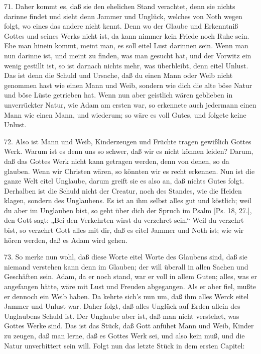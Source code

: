 71. Daher kommt es, daß sie den ehelichen Stand verachtet, denn sie nichts darinne findet und sieht denn Jammer und Unglück, welches von Noth wegen folgt, wo eines das andere nicht kennt. Denn wo der Glaube und Erkenntniß Gottes und seines Werks nicht ist, da kann nimmer kein Friede noch Ruhe sein. Ehe man hinein kommt, meint man, es soll eitel Lust darinnen sein. Wenn man nun darinne ist, und meint zu finden, was man gesucht hat, und der Vorwitz ein wenig gestillt ist, so ist darnach nichts mehr, was überbleibt, denn eitel Unlust. Das ist denn die Schuld und Ursache, daß du einen Mann oder Weib nicht genommen hast wie einen Mann und Weib, sondern wie dich die alte böse Natur und böse Lüste getrieben hat. Wenn nun aber geistlich wären geblieben in unverrückter Natur, wie Adam am ersten war, so erkennete auch jedermann einen Mann wie einen Mann, und wiederum; so wäre es voll Gutes, und folgete keine Unlust.

72. Also ist Mann und Weib, Kinderzeugen und Früchte tragen gewißlich Gottes Werk. Warum ist es denn uns so schwer, daß wir es nicht können leiden? Darum, daß das Gottes Werk nicht kann getragen werden, denn von denen, so da glauben. Wenn wir Christen wären, so könnten wir es recht erkennen. Nun ist die ganze Welt eitel Unglaube, darum greift sie es also an, daß nichts Gutes folgt. Derhalben ist die Schuld nicht der Creatur, noch des Standes, wie die Heiden klagen, sondern des Unglaubens. Es ist an ihm selbst alles gut und köstlich; weil du aber im Unglauben bist, so geht über dich der Spruch im Psalm [Ps. 18, 27.], den Gott sagt: „Bei den Verkehrten wirst
du verzehret sein.“ Weil du verzehrt bist, so verzehrt Gott alles mit dir, daß es eitel Jammer und Noth ist; wie wir hören werden, daß es Adam wird gehen.

73. So merke nun wohl, daß diese Worte eitel Worte des Glaubens sind, daß sie niemand verstehen kann denn im Glauben; der will überall in allen Sachen und Geschäften sein. Adam, da er noch stand, war er voll in allem Guten; alles, was er angefangen hätte, wäre mit Lust und Freuden abgegangen. Als er aber fiel, mußte er dennoch ein Weib haben. Da kehrte sich’s nun um, daß ihm alles Werck eitel Jammer und Unlust war. Daher folgt, daß alles Unglück auf Erden allein des Unglaubens Schuld ist. Der Unglaube aber ist, daß man nicht verstehet, was Gottes Werke sind. Das ist das Stück, daß Gott anfühet Mann und Weib, Kinder zu zeugen, daß man lerne, daß es Gottes Werk sei, und also kein muß, und die Natur unverbittert sein will. Folgt nun das letzte Stück in dem ersten Capitel:


